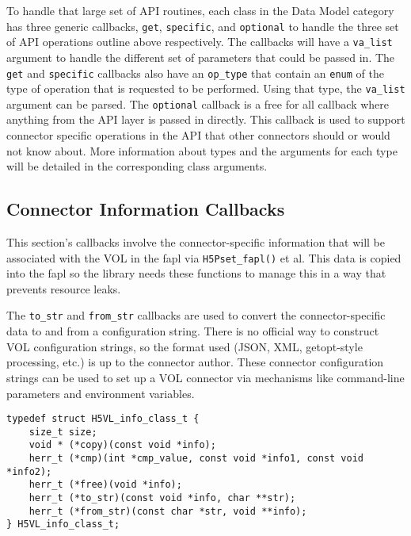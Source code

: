 To handle that large set of API routines, each class in the Data Model category has three generic callbacks, \texttt{get}, \texttt{specific}, and \texttt{optional} to handle the three set of API operations outline above respectively. The callbacks will have a \texttt{va\_list} argument to handle the different set of parameters that could be passed in.  The \texttt{get} and \texttt{specific} callbacks also have an \texttt{op\_type} that contain an \texttt{enum} of the type of operation that is requested to be performed. Using that type, the \texttt{va\_list} argument can be parsed. The \texttt{optional} callback is a free for all callback where anything from the API layer is passed in directly. This callback is used to support connector specific operations in the API that other connectors should or would not know about. More information about types and the arguments for each type will be detailed in the corresponding class arguments.


\subsection{Connector Information Callbacks}

This section's callbacks involve the connector-specific information that will be associated with the VOL in the fapl via \texttt{H5Pset\_fapl()} et al. This data is copied into the fapl so the library needs these functions to manage this in a way that prevents resource leaks.

The \texttt{to\_str} and \texttt{from\_str} callbacks are used to convert the connector-specific data to and from a configuration string. There is no official way to construct VOL configuration strings, so the format used (JSON, XML, getopt-style processing, etc.) is up to the connector author. These connector configuration strings can be used to set up a VOL connector via mechanisms like command-line parameters and environment variables.

\begin{lstlisting}[caption={Info class for connector information routines, H5VLconnector.h}, captionpos=b, label={lst:Infoclass}]
typedef struct H5VL_info_class_t {                                               
    size_t size;
    void * (*copy)(const void *info);
    herr_t (*cmp)(int *cmp_value, const void *info1, const void *info2);
    herr_t (*free)(void *info);
    herr_t (*to_str)(const void *info, char **str);
    herr_t (*from_str)(const char *str, void **info);
} H5VL_info_class_t;
\end{lstlisting}

